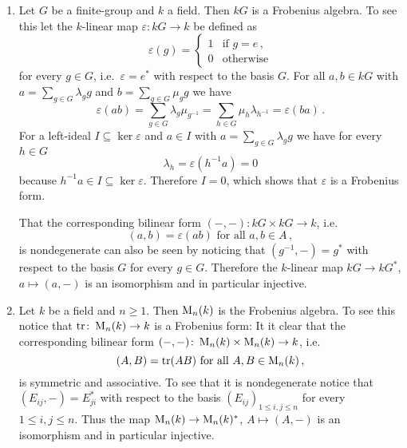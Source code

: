 \begin{expls}
  \begin{enumerate}[label=\emph{\alph*)},leftmargin=*]
    \item
      Let $G$ be a finite-group and $k$ a field.
      Then $kG$ is a Frobenius algebra.
      To see this let the $k$-linear map $\varepsilon \colon kG \to k$ be defined as
      \[
          \varepsilon(g)
        = \begin{cases}
            1 & \text{if } g = e \,,  \\
            0 & \text{otherwise}
          \end{cases}
      \]
      for every $g \in G$, i.e.\ $\varepsilon = e^*$ with respect to the basis $G$.
      For all $a, b \in kG$ with $a = \sum_{g \in G} \lambda_g g$ and $b = \sum_{g \in G} \mu_g g$ we have
      \[
          \varepsilon(ab)
        = \sum_{g \in G} \lambda_g \mu_{g^{-1}}
        = \sum_{h \in G} \mu_h \lambda_{h^{-1}}
        = \varepsilon(ba) \,.
      \]
      For a left-ideal $I \subseteq \ker \varepsilon$ and $a \in I $ with $a = \sum_{g \in G} \lambda_g g$ we have for every $h \in G$
      \[
          \lambda_h
        = \varepsilon\left( h^{-1} a \right)
        = 0
      \]
      because $h^{-1} a \in I \subseteq \ker \varepsilon$.
      Therefore $I = 0$, which shows that $\varepsilon$ is a Frobenius form.
      
      That the corresponding bilinear form $(-,-) \colon kG \times kG \to k$, i.e.\
      \[
          (a,b)
        = \varepsilon(ab)
        \text{ for all }
        a, b \in A \,,
      \]
      is nondegenerate can also be seen by noticing that $(g^{-1},-) = g^*$ with respect to the basis $G$ for every $g \in G$.
      Therefore the $k$-linear map $kG \to kG^*$, $a \mapsto (a,-)$ is an isomorphism and in particular injective.
    \item
      Let $k$ be a field and $n \geq 1$.
      Then $\operatorname{M}_n(k)$ is the Frobenius algebra.
      To see this notice that $\operatorname{tr} \colon \operatorname{M}_n(k) \to k$ is a Frobenius form:
      It it clear that the corresponding bilinear form $(-,-) \colon \operatorname{M}_n(k) \times \operatorname{M}_n(k) \to k$, i.e.\
      \[
          (A,B)
        = \operatorname{tr}(AB)
        \text{ for all }
        A, B \in \operatorname{M}_n(k) \,,
      \]
      is symmetric and associative.
      To see that it is nondegenerate notice that $(E_{ij}, -) = E_{ji}^*$ with respect to the basis $(E_{ij})_{1 \leq i,j \leq n}$ for every $1 \leq i,j \leq n$.
      Thus the map $\operatorname{M}_n(k) \to \operatorname{M}_n(k)^*$, $A \mapsto (A,-)$ is an isomorphism and in particular injective.
  \end{enumerate}
\end{expls}


